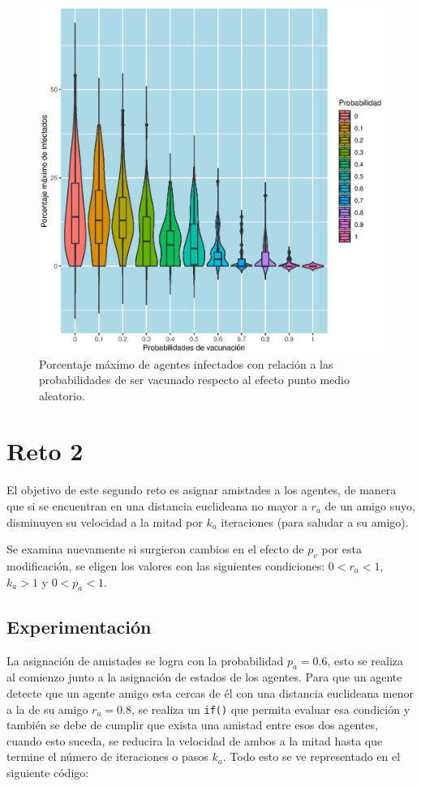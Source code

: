\documentclass{article}
\begin{document}
\begin{figure}[h!]
\centering\includegraphics[width=120mm]{ResultadosP6R1.eps}
\caption{Porcentaje m\'aximo de agentes infectados con relaci\'on a las probabilidades de ser vacunado respecto al efecto punto medio aleatorio.}
\label{fig:resultadosR1}
\end{figure}

\section{Reto 2}

El objetivo de este segundo reto es asignar amistades a los agentes, de manera que si se encuentran en una distancia euclideana no mayor a $r_a$ de un amigo suyo, disminuyen su velocidad a la mitad por $k_a$ iteraciones (para saludar a su amigo).

Se examina nuevamente si surgieron cambios en el efecto de $p_v$ por esta modificaci\'on, se eligen los valores con las siguientes condiciones: $0 < r_a < 1$,  $k_a  >  1$ y $0 < p_a < 1$.

\newpage

\subsection{Experimentaci\'on}

La asignaci\'on de amistades se logra con la probabilidad $p_a = 0.6$, esto se realiza al comienzo junto a la asignaci\'on de estados de los agentes. Para que un agente detecte que un agente amigo esta cercas de \'el con una distancia euclideana menor a la de su amigo $r_a = 0.8$, se realiza un \texttt{if()} que permita evaluar esa condici\'on y tambi\'en se debe de cumplir que exista una amistad entre esos dos agentes, cuando esto suceda, se reducira la velocidad de ambos a la mitad hasta que termine el n\'umero de iteraciones o pasos $k_a$. Todo esto se ve representado en el siguiente c\'odigo:
\end{document}
